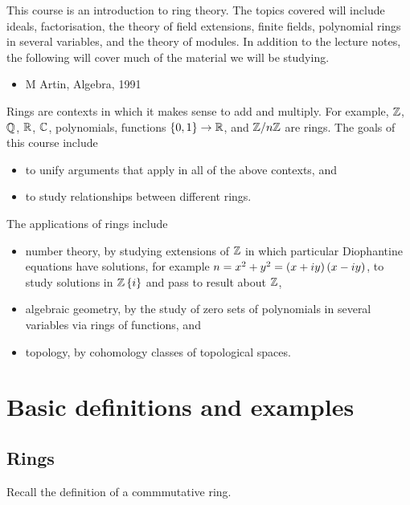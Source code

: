 This course is an introduction to ring theory. The topics covered will include ideals, factorisation, the theory of field extensions, finite fields, polynomial rings in several variables, and the theory of modules. In addition to the lecture notes, the following will cover much of the material we will be studying.
\begin{itemize}
\item M Artin, Algebra, 1991
\end{itemize}
Rings are contexts in which it makes sense to add and multiply. For example, $ \mathbb{Z} $, $ \mathbb{Q} $, $ \mathbb{R} $, $ \mathbb{C} $, polynomials, functions $ \left\{ 0, 1 \right\} \to \mathbb{R} $, and $ \mathbb{Z} / n\mathbb{Z} $ are rings. The goals of this course include
\begin{itemize}
\item to unify arguments that apply in all of the above contexts, and
\item to study relationships between different rings.
\end{itemize}
The applications of rings include
\begin{itemize}
\item number theory, by studying extensions of $ \mathbb{Z} $ in which particular Diophantine equations have solutions, for example $ n = x^2 + y^2 = \left( x + iy \right)\left( x - iy \right) $, to study solutions in $ \mathbb{Z}\left\{ i \right\} $ and pass to result about $ \mathbb{Z} $,
\item algebraic geometry, by the study of zero sets of polynomials in several variables via rings of functions, and
\item topology, by cohomology classes of topological spaces.
\end{itemize}

\pagebreak

\section{Basic definitions and examples}

\subsection{Rings}

Recall the definition of a commmutative ring.

